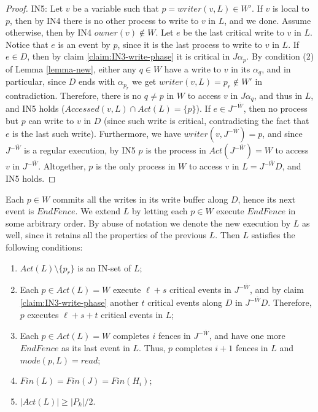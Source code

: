 \begin{proof}
	IN5: Let $v$ be a variable such that $p = writer(v,L) \in W'$. If $v$ is local to $p$, then by IN4 there is no other process to write to $v$ in $L$, and we done. Assume otherwise, then by IN4 $owner(v) \notin W$. Let $e$ be the last critical write to $v$ in $L$. Notice that $e$ is an event by $p$, since it is the last process to write to $v$ in $L$.
	If $e \in D$, then by claim \ref{claim:IN3-write-phase} it is critical in $J \alpha_p$. By condition (2) of Lemma \ref{lemma-new}, either any $q \in W$ have a write to $v$ in its $\alpha_q$, and in particular, since $D$ ends with $\alpha_{p_r}$ we get $writer(v,L) = p_r \notin W'$ in contradiction. Therefore, there is no $q \neq p$ in $W$ to access $v$ in $J \alpha_q$, and thus in $L$, and IN5 holds ($Accessed(v,L) \cap Act(L) =\{p\}$).
	If $e \in J^{-\overline{W}}$, then no process but $p$ can write to $v$ in $D$ (since such write is critical, contradicting the fact that $e$ is the last such write). Furthermore, we have $writer(v,J^{-\overline{W}}) = p$, and since $J^{-\overline{W}}$ is a regular execution, by IN5 $p$ is the process in $Act(J^{-\overline{W}}) = W$ to access $v$ in $J^{-\overline{W}}$. Altogether, $p$ is the only process in $W$ to access $v$ in $L = J^{-\overline{W}} D$, and IN5 holds.
\end{proof}

Each $p \in W$ commits all the writes in its write buffer along $D$, hence its next event is $EndFence$. We extend $L$ by letting each $p \in W$ execute $EndFence$ in some arbitrary order. By abuse of notation we denote the new execution by $L$ as well, since it retains all the properties of the previous $L$. Then $L$ satisfies the following conditions:
\begin{enumerate}
	\item $Act(L) \setminus \{p_r\}$ is an IN-set of $L$;
	\item Each $p \in Act(L) = W$ execute $\ell+s$ critical events in $J^{-\overline{W}}$, and by claim \ref{claim:IN3-write-phase} another $t$ critical events along $D$ in $J^{-\overline{W}} D$. Therefore, $p$ executes $\ell+s+t$ critical events in $L$;
	\item Each $p \in Act(L) = W$ completes $i$ fences in $J^{-\overline{W}}$, and have one more $EndFence$ as its last event in $L$. Thus, $p$ completes $i+1$ fences in $L$ and $mode(p,L) = read$;
	\item $Fin(L) = Fin(J) = Fin(H_i)$;
	\item $|Act(L)| \geq |P_k|/2$.
\end{enumerate}

